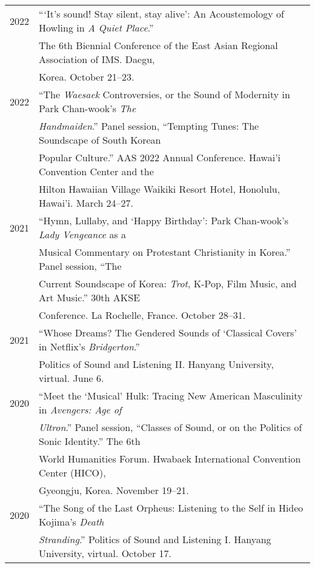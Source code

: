 \documentclass[letter,11pt,draft]{article}
\begin{document}
  \hspace*{-0.25cm}
  \begin{tabular}{p{2.5cm} p{12.5cm}}
    2022 & “‘It’s sound! Stay silent, stay alive’: An Acoustemology of Howling in \textit{A Quiet Place}.”\\
    & The 6th Biennial Conference of the East Asian Regional Association of IMS. Daegu,\\
    & Korea. October 21–23.\\[2mm]
    
    2022 & “The \textit{Waesaek} Controversies, or the Sound of Modernity in Park Chan-wook’s \textit{The}\\
    & \textit{Handmaiden}.” Panel session, “Tempting Tunes: The Soundscape of South Korean\\
    & Popular Culture.” AAS 2022 Annual Conference. Hawai'i Convention Center and the\\
    & Hilton Hawaiian Village Waikiki Resort Hotel, Honolulu, Hawai'i. March 24–27.\\[2mm]
    
    2021 & “Hymn, Lullaby, and ‘Happy Birthday’: Park Chan-wook’s \textit{Lady Vengeance} as a\\
    & Musical Commentary on Protestant Christianity in Korea.” Panel session, “The\\
    & Current Soundscape of Korea: \textit{Trot}, K-Pop, Film Music, and Art Music.” 30th AKSE\\
    & Conference. La Rochelle, France. October 28–31.\\[2mm]

    2021 & “Whose Dreams? The Gendered Sounds of `Classical Covers' in Netflix’s \textit{Bridgerton}.”\\
    & Politics of Sound and Listening II. Hanyang University, virtual. June 6.\\[2mm]
    
    2020 & “Meet the ‘Musical’ Hulk: Tracing New American Masculinity in \textit{Avengers: Age of}\\
    & \textit{Ultron}.” Panel session, “Classes of Sound, or on the Politics of Sonic Identity.” The 6th\\
    & World Humanities Forum. Hwabaek International Convention Center (HICO),\\
    & Gyeongju, Korea. November 19–21.\\[2mm]
  
    2020 & “The Song of the Last Orpheus: Listening to the Self in Hideo Kojima’s \textit{Death}\\
    & \textit{Stranding}.” Politics of Sound and Listening I. Hanyang University, virtual. October 17.\\[2mm]
  

\end{tabular}
\end{document}
